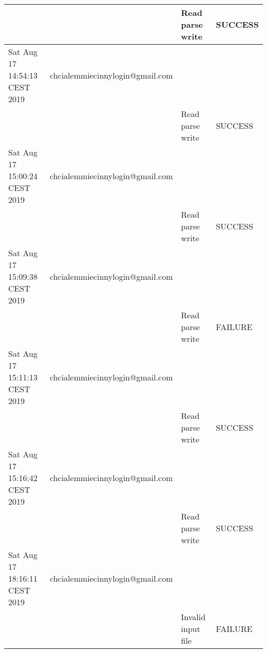\begin{table}[]
{\begin{tabular}{|l|l|l|l|}
    &                                            & Read parse write                            & SUCCESS                                \\ \hline
    Sat Aug 17 14:54:13 CEST 2019        & chcialemmiecinnylogin@gmail.com            &                                             &                                        \\ \hline
    &                                            & Read parse write                            & SUCCESS                                \\ \hline
    Sat Aug 17 15:00:24 CEST 2019        & chcialemmiecinnylogin@gmail.com            &                                             &                                        \\ \hline
    &                                            & Read parse write                            & SUCCESS                                \\ \hline
    Sat Aug 17 15:09:38 CEST 2019        & chcialemmiecinnylogin@gmail.com            &                                             &                                        \\ \hline
    &                                            & Read parse write                            & FAILURE                                \\ \hline
    Sat Aug 17 15:11:13 CEST 2019        & chcialemmiecinnylogin@gmail.com            &                                             &                                        \\ \hline
    &                                            & Read parse write                            & SUCCESS                                \\ \hline
    Sat Aug 17 15:16:42 CEST 2019        & chcialemmiecinnylogin@gmail.com            &                                             &                                        \\ \hline
    &                                            & Read parse write                            & SUCCESS                                \\ \hline
    Sat Aug 17 18:16:11 CEST 2019        & chcialemmiecinnylogin@gmail.com            &                                             &                                        \\ \hline
    &                                            & Invalid input file                          & FAILURE                                \\ \hline

\end{tabular}}
\end{table}
